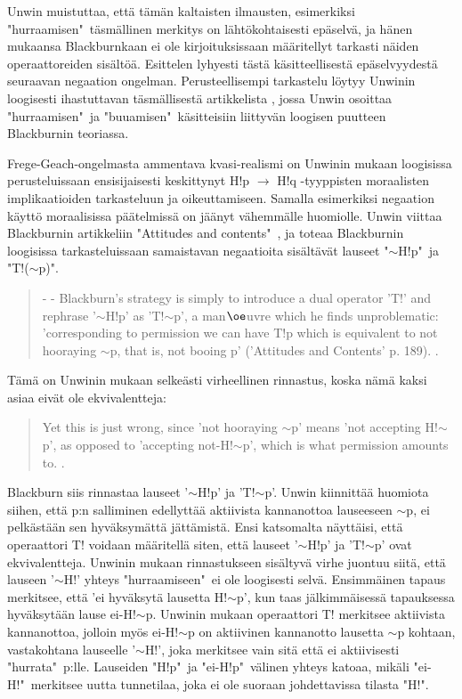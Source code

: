 \documentclass[a4paper,12pt,times,titlepage,finnish]{article}
\begin{document}
Unwin muistuttaa, että tä\-män kaltaisten ilmausten, esimerkiksi "hurraamisen"\ täs\-mäl\-li\-nen merkitys on lähtökohtaisesti epäselvä, ja hänen mukaansa Blackburnkaan ei ole kirjoituksissaan määritellyt tarkasti näiden operaattoreiden sisältöä. Esittelen lyhyesti tästä käsitteellisestä epäselvyydestä seuraavan negaation ongelman. Perusteellisempi tarkastelu löytyy Unwinin loogisesti ihastuttavan täs\-mäl\-li\-ses\-tä artikkelista \citep{Unwin99}, jossa Unwin osoittaa "hurraamisen"\ ja "buuamisen"\ käsitteisiin liittyvän loogisen puutteen Blackburnin teoriassa. 

Frege-Geach-ongelmasta ammentava kvasi-\-realismi on Unwinin mukaan loogisissa perusteluissaan ensisijaisesti keskittynyt H!p \(\rightarrow\) H!q -tyyppisten mo\-raa\-lis\-ten implikaatioiden tarkasteluun ja oikeuttamiseen. Samalla esimerkiksi negaation käyttö moraalisissa päätelmissä on jäänyt vähemmälle huomiolle. Unwin viittaa Blackburnin artikkeliin "Attitudes and contents"\ \citep[189]{Blackburn93}, ja toteaa Blackburnin loogisissa tarkasteluissaan samaistavan negaatioita sisältävät lauseet "\(\sim\)H!p"\ ja "T!(\(\sim\)p)". 


\begin{quote}
	- - Blackburn's strategy is simply to introduce a dual operator 'T!' and rephrase '\(\sim\)H!p' as 'T!\(\sim\)p', a man\(\oe\)uvre which he finds unproblematic: 'corresponding to permission we can have T!p which is equivalent to not hooraying \(\sim\)p, that is, not booing p' ('Attitudes and Contents' p. 189). \citep[341]{Unwin99}.
\end{quote}

Tä\-mä on Unwinin mukaan selkeästi virheellinen rinnastus, koska nämä kaksi asiaa eivät ole ekvivalentteja:

\begin{quote}
Yet this is just wrong, since 'not hooraying \(\sim\)p' means 'not accepting H!\(\sim\)p', as opposed to 'accepting not-H!\(\sim\)p', which is what permission amounts to. \citep[341]{Unwin99}.
\end{quote}

Blackburn siis rinnastaa lauseet '\(\sim\)H!p' ja 'T!\(\sim\)p'. Unwin kiinnittää huomiota siihen, että p:n salliminen edellyttää aktiivista kannanottoa lauseeseen \(\sim\)p, ei pelkästään sen hyväksymättä jättämistä. Ensi katsomalta näyttäisi, että operaattori T! voidaan määritellä siten, että lauseet '\(\sim\)H!p' ja 'T!\(\sim\)p' ovat ekvivalentteja. Unwinin mukaan rinnastukseen sisältyvä virhe juontuu siitä, että lauseen '\(\sim\)H!' yhteys "hurraamiseen"\ ei ole loogisesti selvä. Ensimmäinen tapaus merkitsee, että 'ei hyväksytä lausetta H!\(\sim\)p', kun taas jälkimmäisessä tapauksessa hyväksytään lause ei-H!\(\sim\)p. Unwinin mukaan operaattori T! merkitsee aktiivista kannanottoa, jolloin myös ei-H!\(\sim\)p on aktiivinen kannanotto lausetta \(\sim\)p kohtaan,  vastakohtana lauseelle '\(\sim\)H!', joka merkitsee vain sitä että ei aktiivisesti "hurrata"\ p:lle. Lauseiden "H!p"\ ja "ei-H!p"\ välinen yhteys katoaa, mikäli "ei-H!"\ merkitsee uutta tunnetilaa, joka ei ole suoraan johdettavissa tilasta "H!". 
\end{document}
